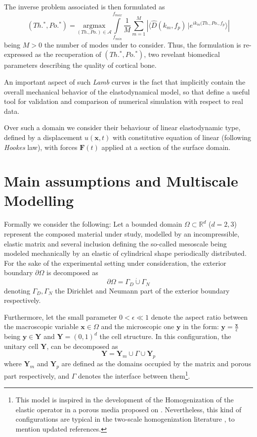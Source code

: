The inverse problem associated is then formulated as
\begin{equation*}
    (Th.^*, Po.^*) = \underset{(Th., Po.) \in \mathcal{A}}{\text{argmax}} \int\limits_{f_{min}}^{f_{max}} \frac{1}{M} \sum_{m=1}^M \left \vert \langle \hat{D}(k_m, f_p)\, \vert e^{ik_m(Th., Po., f_p} \rangle \right \vert
\end{equation*}
being $M>0$ the number of modes under to consider. Thus, the formulation is re-expressed as the recuperation of $(Th.^*, Po.^*)$, two revelant biomedical parameters describing the quality of cortical bone.

An important aspect of such \textit{Lamb} curves is the fact that implicitly contain the overall mechanical behavior of the elastodynamical model, so that define a useful tool for validation and comparison of numerical simulation with respect to real data. 


Over such a domain we consider their behaviour of linear elastodynamic type, defined by a displacement $u(\mathbf{x},t)$ with constitutive equation of linear (following \textit{Hookes} law), with forces $\mathbf{F}(t)$ applied at a section of the surface domain.

\section{Main assumptions and Multiscale Modelling}


Formally we consider the following:
Let a bounded domain $\Omega \subset \mathbb{R}^d$ ($d = 2,3$) represent the composed material under study, modelled by an incompressible, elastic matrix and several inclusion defining the so-called mesoscale being modeled mechanically by an elastic of cylindrical shape periodically distributed.
For the sake of the experimental setting under consideration, the exterior boundary $\partial \Omega$ is decomposed as
\begin{equation*}
	\partial \Omega = \Gamma_D \dot\cup \Gamma_N
\end{equation*}
denoting $\Gamma_D, \Gamma_N$ the Dirichlet and Neumann part of the exterior boundary respectively.

Furthermore, let the small parameter $0 < \epsilon \ll 1$ denote the aspect ratio between the macroscopic variable $\mathbf{x} \in \Omega$ and the microscopic one $\mathbf{y}$ in the form: $\mathbf{y} = \frac{\mathbf{x}}{\epsilon}$ being $\mathbf{y} \in \mathbf{Y}$ and $\mathbf{Y} = (0,1)^d$ the cell structure. In this configuration, the unitary cell $\mathbf{Y}$, can be decomposed as
\begin{equation*}
	\mathbf{Y} = \mathbf{Y}_m \cup \Gamma \cup \mathbf{Y}_p 
\end{equation*}
where $\mathbf{Y}_m$ and $\mathbf{Y}_p$ are defined as the domains occupied by the matrix and porous part respectively, and $\Gamma$ denotes the interface between them\footnote{This model is inspired in the development of the Homogenization of the elastic operator in a porous media proposed on \cite{christensen1982theory}. Nevertheless, this kind of configurations are typical in the two-scale homogenization literature \cite{panasenko2005multi-scale}, \cite{Boughammoura2013} to mention updated references.}.

